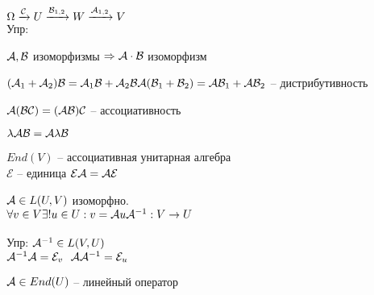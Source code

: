 \documentclass[../spring.tex]{subfiles}
\begin{document}
	$\Omega \xrightarrow{\mathcal{C}} U \xrightarrow{\mathcal{B}_{1, 2}} W \xrightarrow{\mathcal{A}_{1, 2}} V$\\
	Упр: \begin{mylist}
		\item $\mathcal{A}, \mathcal{B}$ изоморфизмы $\Rightarrow \mathcal{A}\cdot \mathcal{B}$ изоморфизм
		\item $(\mathcal{A}_1 + \mathcal{A}_2)\mathcal{B} = \mathcal{A}_1\mathcal{B} + \mathcal{A}_2\mathcal{B}\\
		\mathcal{A}(\mathcal{B}_1 + \mathcal{B}_2) = \mathcal{A} \mathcal{B}_1 + \mathcal{A} \mathcal{B}_2$ -- дистрибутивность
		\item $\mathcal{A}(\mathcal{B}\mathcal{C}) = (\mathcal{A} \mathcal{B})\mathcal{C}$ -- ассоциативность
		\item $\lambda \mathcal{A} \mathcal{B} = \mathcal{A} \lambda \mathcal{B}$
	\end{mylist}
	$End(V)$ -- ассоциативная унитарная алгебра\\
	$\mathcal{E}$ -- единица $\mathcal{E}\mathcal{A} = \mathcal{A}\mathcal{E}$
	\begin{defin}
		$\mathcal{A} \in L(U, V)$ изоморфно.\\
		$\forall v \in V \exists! u \in U: v = \mathcal{A} u\\
		\mathcal{A}^{-1}: V \rightarrow U$\\
		\\
		Упр: $\mathcal{A}^{-1}\in L(V, U)$\\
		$\mathcal{A}^{-1} \mathcal{A} = \mathcal{E}_v \ \ \mathcal{A}\mathcal{A}^{-1} = \mathcal{E}_u$
		
	\end{defin}
	$\mathcal{A}\in End(U)$ -- линейный оператор
	
\end{document}
